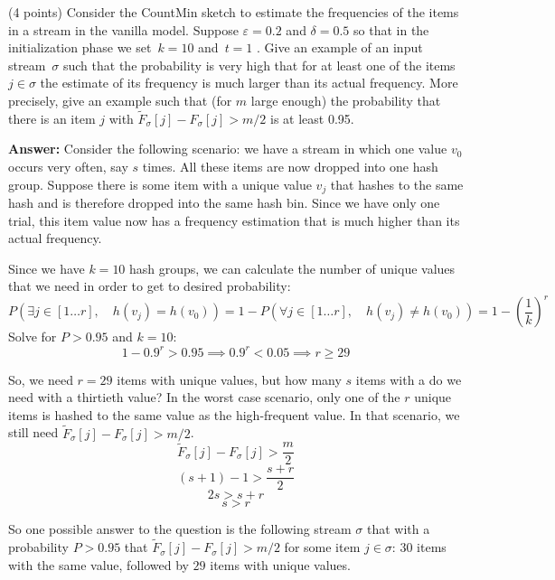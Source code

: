 \documentclass{article}
\newcommand{\eps}{\varepsilon}
\renewcommand{\geq}{\geqslant}
\newcounter{rcounter}
\newenvironment{rlist}%
{\begin{list}{\setnr-\arabic{rcounter}}{\usecounter{rcounter}}}{\end{list}}
\begin{document}
\begin{rlist}
        \item (4 points)
        Consider the CountMin sketch to estimate the frequencies of the items in a stream in the vanilla model. Suppose $\eps=0.2$ and $\delta=0.5$ so that in the initialization phase we set~$k=10$ and~$t=1$ . Give an example of an input stream~$\sigma$ such that the probability is very high that for at least one of the items $j\in \sigma$ the estimate of its frequency is much larger than its actual frequency. More precisely, give an example such that (for $m$ large enough) the probability that there is an item $j$ with $\widetilde{F}_{\sigma}[j] - F_{\sigma}[j] > m/2$ is at least 0.95.
        
        \textbf{Answer:}
        Consider the following scenario: we have a stream in which one value $v_0$ occurs very often, say $s$ times. All these items are now dropped into one hash group. Suppose there is some item with a unique value $v_j$ that hashes to the same hash and is therefore dropped into the same hash bin. Since we have only one trial, this item value now has a frequency estimation that is much higher than its actual frequency.
        
        Since we have $k=10$ hash groups, we can calculate the number of unique values that we need in order to get to desired probability:
        $$P\left(\exists j \in [1\ldots r], \quad h(v_j) = h(v_0)\right) = 1-P(\forall j \in [1\ldots r], \quad h(v_j) \neq h(v_0)) = 1 - \left(\frac{1}{k}\right)^r$$
        Solve for $P>0.95$ and $k=10$:
        $$1-0.9^r > 0.95 \implies 0.9^r < 0.05 \implies r \geq 29$$
        
        So, we need $r=29$ items with unique values, but how many $s$ items with a  do we need with a thirtieth value? In the worst case scenario, only one of the $r$ unique items is hashed to the same value as the high-frequent value. In that scenario, we still need $\widetilde{F}_{\sigma}[j] - F_{\sigma}[j] > m/2$.
        $$\widetilde{F}_{\sigma}[j] - F_{\sigma}[j] > \frac{m}{2}$$
        $$(s+1) - 1 > \frac{s+r}{2}$$
        $$2s > s+r$$
        $$s > r$$
        
        So one possible answer to the question is the following stream $\sigma$ that with a probability $P>0.95$ that $\widetilde{F}_{\sigma}[j] - F_{\sigma}[j] > m/2$ for some item $j \in \sigma$: $30$ items with the same value, followed by $29$ items with unique values.
        
        
        

\end{rlist}
\end{document}

